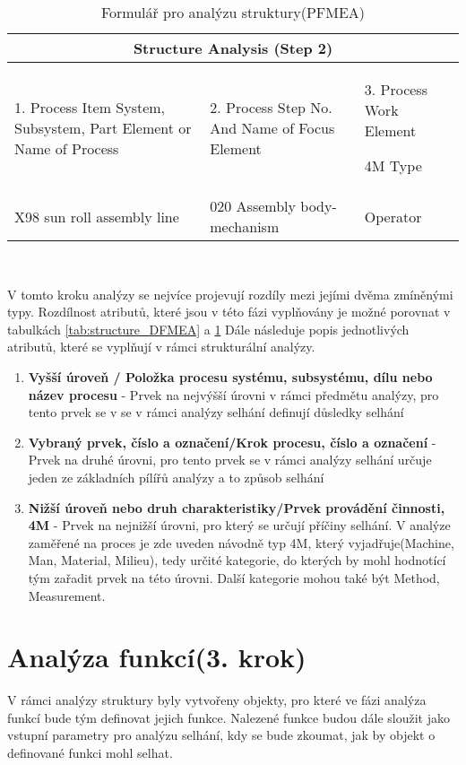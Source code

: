 \begin{center}
\begin{table}[h]
	\centering
	\caption{Formulář pro analýzu struktury(PFMEA) }
	\label{tab:structure_PFMEA}
\begin{tabular}{ |p{4cm}|p{3cm}|p{3cm}|  }
 \hline
 \multicolumn{3}{|c|}{Structure Analysis (Step 2)} \\
 \hline
1. Process Item
System, Subsystem, Part Element or Name of Process
& 2. Process Step
No. And Name of Focus Element
&3. Process Work Element

4M Type\\
 \hline
X98 sun roll assembly line   & 020 Assembly body-mechanism   &Operator\\


 \hline
\end{tabular}\  
\end{table}
\end{center}

V tomto kroku analýzy se nejvíce projevují rozdíly mezi jejími dvěma zmíněnými typy. Rozdílnost atributů, které jsou v této fázi vyplňovány je možné porovnat v tabulkách \ref{tab:structure_DFMEA} a  \ref{tab:structure_PFMEA} 
Dále následuje popis jednotlivých atributů, které se vyplňují v rámci strukturální analýzy. 

\begin{enumerate}
	\item \textbf{Vyšší úroveň / Položka procesu systému, subsystému, dílu nebo název procesu} - Prvek na nejvýšší úrovni v rámci předmětu analýzy, pro tento prvek se v se v rámci analýzy selhání definují důsledky selhání
	\item \textbf{Vybraný prvek, číslo a označení/Krok procesu, číslo a označení} - Prvek na druhé úrovni, pro tento prvek se v rámci analýzy selhání určuje jeden ze základních pílířů analýzy a to způsob selhání
	\item \textbf{Nižší úroveň nebo druh charakteristiky/Prvek provádění činnosti, 4M} - Prvek na nejnižší úrovni, pro který se určují příčiny selhání. V analýze zaměřené na proces je zde uveden návodně typ 4M, který vyjadřuje(Machine, Man, Material, Milieu), tedy určité kategorie, do kterých by mohl hodnotící tým zařadit prvek na této úrovni. Další kategorie mohou také být Method, Measurement.  
\end{enumerate}

\section{Analýza funkcí(3. krok)}
V rámci analýzy struktury byly vytvořeny objekty, pro které ve fázi analýza funkcí bude tým definovat jejich funkce. Nalezené funkce budou dále sloužit jako vstupní parametry pro analýzu selhání, kdy se bude zkoumat, jak by objekt o definované funkci mohl selhat. 

